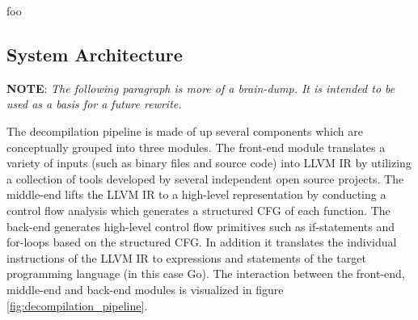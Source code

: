 
foo




\subsection{System Architecture}




\textbf{NOTE}: \textit{The following paragraph is more of a brain-dump. It is intended to be used as a basis for a future rewrite.}

The decompilation pipeline is made of up several components which are conceptually grouped into three modules. The front-end module translates a variety of inputs (such as binary files and source code) into LLVM IR by utilizing a collection of tools developed by several independent open source projects. The middle-end lifts the LLVM IR to a high-level representation by conducting a control flow analysis which generates a structured CFG of each function. The back-end generates high-level control flow primitives such as if-statements and for-loops based on the structured CFG. In addition it translates the individual instructions of the LLVM IR to expressions and statements of the target programming language (in this case Go). The interaction between the front-end, middle-end and back-end modules is visualized in figure \ref{fig:decompilation_pipeline}.

